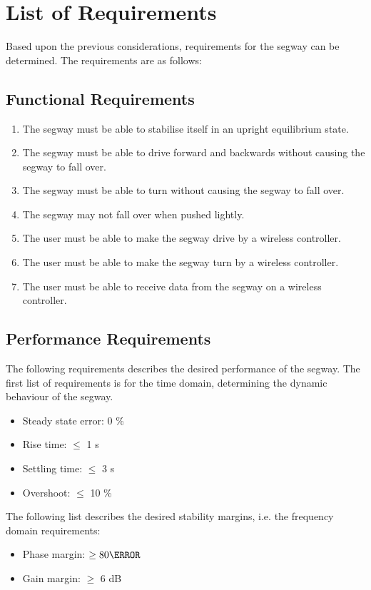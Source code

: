 \section{List of Requirements \label{requirements}}
Based upon the previous considerations, requirements for the segway can be determined. The requirements are as follows:

\subsection*{Functional Requirements}
\begin{enumerate}
\item The segway must be able to stabilise itself in an upright equilibrium state.\label{funcReqBalance}
\item The segway must be able to drive forward and backwards without causing the segway to fall over.
\item The segway must be able to turn without causing the segway to fall over.
\item The segway may not fall over when pushed lightly.
\item The user must be able to make the segway drive by a wireless controller.
\item The user must be able to make the segway turn by a wireless controller.
\item The user must be able to receive data from the segway on a wireless controller.
\end{enumerate}
\subsection*{Performance Requirements}
The following requirements describes the desired performance of the segway. The first list of requirements is for the time domain, determining the dynamic behaviour of the segway. %
\begin{itemize}
\item Steady state error: 0 \%
\item Rise time: $\leq$ 1 s
\item Settling time: $\leq$ 3 s
\item Overshoot: $\leq$ 10 \% 
\end{itemize}
The following list describes the desired stability margins, i.e. the frequency domain requirements:
\begin{itemize}
\item Phase margin: $\geq 80\degree$
\item Gain margin: $\geq$ 6 dB
\end{itemize}

